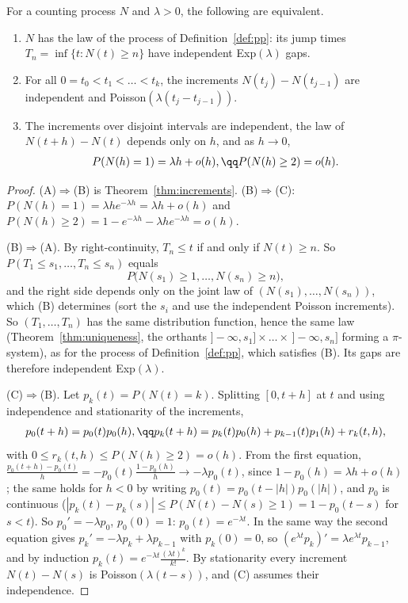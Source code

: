 \begin{theorem}\label{thm:threedefs}
For a counting process $N$ and $\lambda>0$, the following are equivalent.
\begin{enumerate}
\item[(A)] $N$ has the law of the process of Definition~\ref{def:pp}: its jump times $T_n=\inf\{t:N(t)\ge n\}$ have independent Exp$(\lambda)$ gaps.
\item[(B)] For all $0=t_0<t_1<\dots<t_k$, the increments $N(t_j)-N(t_{j-1})$ are independent and Poisson$(\lambda(t_j-t_{j-1}))$.
\item[(C)] The increments over disjoint intervals are independent, the law of $N(t+h)-N(t)$ depends only on $h$, and as $h\to0$,
\[
\begin{gathered}P(N(h)=1)=\lambda h+o(h),\qq P(N(h)\ge2)=o(h).\end{gathered}
\]
\end{enumerate}
\end{theorem}
\begin{proof}
(A)$\Rightarrow$(B) is Theorem~\ref{thm:increments}. (B)$\Rightarrow$(C): $P(N(h)=1)=\lambda he^{-\lambda h}=\lambda h+o(h)$ and $P(N(h)\ge2)=1-e^{-\lambda h}-\lambda he^{-\lambda h}=o(h)$.

(B)$\Rightarrow$(A). By right-continuity, $T_n\le t$ if and only if $N(t)\ge n$. So $P(T_1\le s_1,\dots,T_n\le s_n)$ equals
\[
P\bigl(N(s_1)\ge1,\dots,N(s_n)\ge n\bigr),
\]
and the right side depends only on the joint law of $(N(s_1),\dots,N(s_n))$, which (B) determines (sort the $s_i$ and use the independent
Poisson increments). So $(T_1,\dots,T_n)$ has the same distribution function, hence the same law (Theorem~\ref{thm:uniqueness}, the orthants $]-\infty,s_1]\times\dots\times\,]-\infty,s_n]$
forming a $\pi$-system), as for the process of Definition~\ref{def:pp}, which satisfies (B). Its gaps are therefore independent Exp$(\lambda)$.

(C)$\Rightarrow$(B). Let $p_k(t)=P(N(t)=k)$. Splitting $[0,t+h]$ at $t$ and using independence and stationarity of the increments,
\[
\begin{gathered}p_0(t+h)=p_0(t)p_0(h),\qq p_k(t+h)=p_k(t)p_0(h)+p_{k-1}(t)p_1(h)+r_k(t,h),\end{gathered}
\]
with $0\le r_k(t,h)\le P(N(h)\ge2)=o(h)$. From the first equation, $\frac{p_0(t+h)-p_0(t)}h=-p_0(t)\frac{1-p_0(h)}h\to-\lambda p_0(t)$, since $1-p_0(h)=\lambda h+o(h)$; the same holds for
$h<0$ by writing $p_0(t)=p_0(t-|h|)p_0(|h|)$, and $p_0$ is continuous ($|p_k(t)-p_k(s)|\le P(N(t)-N(s)\ge1)=1-p_0(t-s)$ for $s<t$). So $p_0'=-\lambda p_0$, $p_0(0)=1$: $p_0(t)=e^{-\lambda t}$. In
the same way the second equation gives $p_k'=-\lambda p_k+\lambda p_{k-1}$ with $p_k(0)=0$, so $(e^{\lambda t}p_k)'=\lambda e^{\lambda t}p_{k-1}$, and by induction $p_k(t)=e^{-\lambda t}\frac{(\lambda t)^k}{k!}$. By
stationarity every increment $N(t)-N(s)$ is Poisson$(\lambda(t-s))$, and (C) assumes their independence.
\end{proof}

